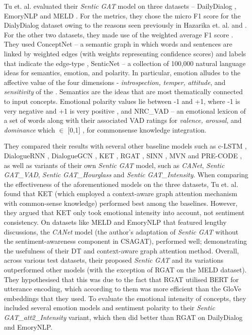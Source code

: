 Tu et. al. evaluated their \textit{Sentic GAT} model on three datasets -- DailyDialog \cite{Li2017DailyDialogAM}, EmoryNLP \cite{Zahiri2017EmotionDO} and MELD \cite{Poria2018MELDAM}. For the metrics, they chose the micro F1 score for the DialyDialog dataset owing to the reasons seen previously in Hazarika et. al. \cite{Hazarika2019ConversationalTL} and \cite{Chatterjee2019UnderstandingEI}. For the other two datasets, they made use of the weighted average F1 score \cite{Majumder2018DialogueRNNAA}. They used ConceptNet -- a semantic graph in which words and sentences are linked by weighted edges (with weights representing confidence scores) and labels that indicate the edge-type \cite{Speer2016ConceptNet5A}, SenticNet --  a collection of 100,000 natural language ideas for semantics, emotion, and polarity. In particular, emotion alludes to the affective value of the four dimensions - \textit{introspection, temper, attitude}, and \textit{sensitivity} of the \cite{Susanto2020TheHM}. Semantics are the ideas that are most thematically connected to input concepts. Emotional polarity values lie between -1 and +1, where -1 is very negative and +1 is very positive \cite{Cambria2020SenticNet6E}, and NRC\_VAD -- an emotional lexicon of a set of words along with their associated VAD ratings for \textit{valence, arousal}, and \textit{dominance} which $\in$ [0,1] \cite{Mohammad2018ObtainingRH}, for commonsense knowledge integration.

They compared their results with several other baseline models such as c-LSTM \cite{poria-etal-2017-context}, DialogueRNN \cite{Majumder2018DialogueRNNAA}, DialogueGCN \cite{Ghosal2019DialogueGCNAG}, KET \cite{Zhong2019KnowledgeEnrichedTF}, RGAT \cite{Ishiwatari2020RelationawareGA}, SINN \cite{Feng2021SINNAS}, MVN \cite{Ma2021AMN} and PRE-CODE \cite{Jiao2020ExploitingUD}, as well as variants of their own \textit{Sentic GAT} model, such as \textit{CANet}, \textit{Sentic GAT\_VAD}, \textit{Sentic GAT\_Hourglass} and \textit{Sentic GAT\_Intensity}. When comparing the effectiveness of the aforementioned models on the three datasets, Tu et. al. found that KET (which employed a context-aware graph attention mechanism with common-sense knowledge) performed best among the baselines. However, they argued that KET only took emotional intensity into account, not sentiment consistency. On datasets like MELD and EmoryNLP that featured lengthy discussions, the \textit{CANet} model (the author's adaptation of \textit{Sentic GAT} without the sentiment-awareness component in CSAGAT), performed well; demonstrating the usefulness of their DT and context-aware graph attention method. Overall, across various test datasets, their proposed \textit{Sentic GAT} and its variations outperformed other models (with the exception of RGAT on the MELD dataset). They hypothesised that this was due to the fact that RGAT utilised BERT \cite{Devlin2019BERTPO} for utterance encoding, which according to them was more efficient than the GloVe embeddings that they used. To evaluate the emotional intensity of concepts, they included several emotion models and sentiment polarity to their \textit{Sentic GAT\_att2\_Intensity} variant, which then did better than RGAT on DailyDialog and EmoryNLP.

